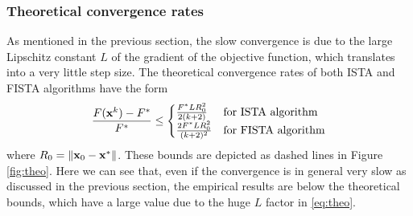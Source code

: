 \documentclass{article}
\begin{document}
\subsubsection*{Theoretical convergence rates}
As mentioned in the previous section, the slow convergence is due to the large Lipschitz constant $L$ of the gradient of the objective function, which translates into a very little step size. The theoretical convergence rates of both ISTA and FISTA algorithms have the form
\begin{align}
    \frac{F(\mathbf{x}^k) - F^*}{F^*} \leq 
    \begin{cases}
        \frac{F^* L R_0^2}{2(k+2)} &\text{for ISTA algorithm} \\
        \frac{2 F^* L R_0^2}{(k+2)^2} &\text{for FISTA algorithm}
    \end{cases}
    \label{eq:theo}
\end{align}
where $R_0 = \left\lVert\mathbf{x}_0 - \mathbf{x}^*\right\rVert$. These bounds are depicted as dashed lines in Figure \ref{fig:theo}. Here we can see that, even if the convergence is in general very slow as discussed in the previous section, the empirical results are below the theoretical bounds, which have a large value due to the huge $L$ factor in \eqref{eq:theo}.
\end{document}
